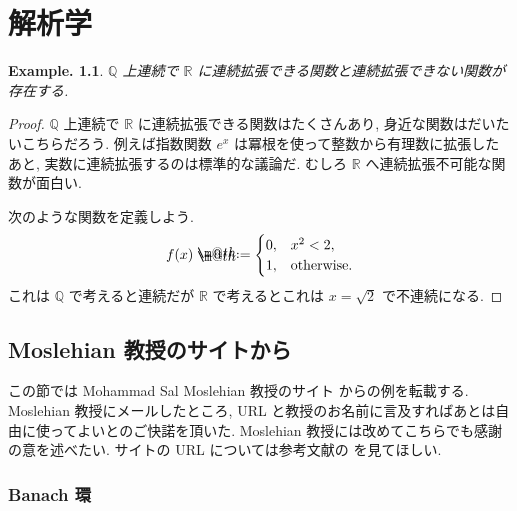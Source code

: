 \documentclass[openany, a4paper, oneside]{jsbook}
\makeatletter
\newcommand*{\defeq}{\mathrel{\rlap{%
\raisebox{0.3ex}{$\m@th\cdot$}}%
\raisebox{-0.3ex}{$\m@th\cdot$}}%
=}
\theoremstyle{break}
\theoremstyle{breakdefn}
\newtheorem{ex}[thm]{Example.}
\newcommand{\bbQ}{\mathbb{Q}}
\newcommand{\bbR}{\mathbb{R}}
\makeatother
\begin{document}
\chapter{解析学}


\begin{ex}
$\bbQ$ 上連続で $\bbR$ に連続拡張できる関数と連続拡張できない関数が存在する.
\end{ex}
\begin{proof}
$\bbQ$ 上連続で $\bbR$ に連続拡張できる関数はたくさんあり, 身近な関数はだいたいこちらだろう.
例えば指数関数 $e^x$ は冪根を使って整数から有理数に拡張したあと, 実数に連続拡張するのは標準的な議論だ.
むしろ $\bbR$ へ連続拡張不可能な関数が面白い.

次のような関数を定義しよう.
\begin{align}
 f(x)
 \defeq
 \begin{cases}
  0, & x^2 < 2, \\
  1, & \text{otherwise}.
 \end{cases}
\end{align}
これは $\bbQ$ で考えると連続だが $\bbR$ で考えるとこれは $x = \sqrt{2}$ で不連続になる.
\end{proof}
\section{Moslehian 教授のサイトから}


この節では Mohammad Sal Moslehian 教授のサイト \cite{MohammadSalMoslehian1} からの例を転載する.
Moslehian 教授にメールしたところ, URL と教授のお名前に言及すればあとは自由に使ってよいとのご快諾を頂いた.
Moslehian 教授には改めてこちらでも感謝の意を述べたい.
サイトの URL については参考文献の \cite{MohammadSalMoslehian1} を見てほしい.
\subsection{Banach 環}
\end{document}
